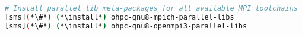 
\begin{lstlisting}[language=bash,keywords={},upquote=true,keepspaces]
# Install parallel lib meta-packages for all available MPI toolchains
[sms](*\#*) (*\install*) ohpc-gnu8-mpich-parallel-libs
[sms](*\#*) (*\install*) ohpc-gnu8-openmpi3-parallel-libs
\end{lstlisting}
